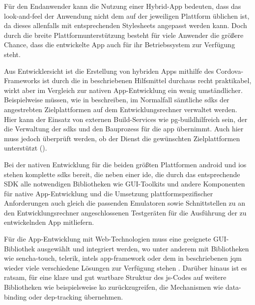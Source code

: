 Für den Endanwender kann die Nutzung einer Hybrid-App bedeuten, dass das \gls{look-and-feel} der Anwendung nicht dem auf der jeweiligen Plattform üblichen ist, da dieses allenfalls mit entsprechenden Stylesheets angepasst werden kann.
Doch durch die breite Plattformunterstützung besteht für viele Anwender die größere Chance, dass die entwickelte App auch für ihr Betriebssystem zur Verfügung steht.


Aus Entwicklersicht ist die Erstellung von hybriden Apps mithilfe des Cordova-Frameworks ist durch die in  beschriebenen Hilfsmittel durchaus recht praktikabel, wirkt aber im Vergleich zur nativen App-Entwicklung ein wenig umständlicher. 
Beispielweise müssen, wie in  beschreiben, im Normalfall sämtliche \glspl{sdk} der angestrebten Zielplattformen auf dem Entwicklungsrechner verwaltet werden.
Hier kann der Einsatz von externen Build-Services wie \gls{pg-build}hilfreich sein, der die Verwaltung der \glspl{sdk} und den Bauprozess für die \gls{app} übernimmt.
Auch hier muss jedoch überprüft werden, ob der Dienst die gewünschten Zielplattformen unterstützt ().

Bei der nativen Entwicklung für die beiden größten Plattformen \gls{android} und \gls{ios} stehen komplette \glspl{sdk} bereit, die neben einer \gls{ide}, die durch das entsprechende SDK alle notwendigen Bibliotheken wie GUI-Toolkits und andere Komponenten für native App-Entwicklung und die Umsetzung plattformspezifischer Anforderungen auch gleich die passenden Emulatoren sowie Schnittstellen zu an den Entwicklungsrechner angeschlossenen Testgeräten für die Ausführung der zu entwickelnden App mitliefern.

Für die App-Entwicklung mit Web-Technologien muss eine geeignete GUI-Bibliothek ausgewählt und integriert werden, wo unter anderem mit Bibliotheken wie \gls{sencha-touch}, \gls{telerik}, \glspl{intel} \gls{app-framework} oder dem in  beschriebenen \gls{jqm} wieder viele verschiedene Lösungen zur Verfügung stehen \cite{sencha, telerik, IntelAppFramework, w3schools_jqm_start}.
Darüber hinaus ist es ratsam, für eine klare und gut wartbare Struktur des \gls{js}-Codes auf weitere Bibliotheken wie beispielsweise \gls{ko} zurückzugreifen, die Mechanismen wie \gls{data-binding} oder \gls{dep-tracking} übernehmen.

